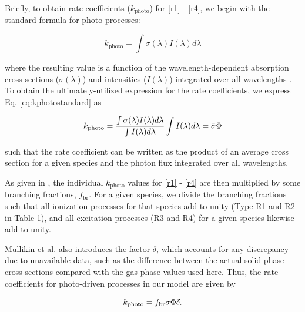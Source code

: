 \documentclass[journal=aesccq,manuscript=article,layout=twocolumn]{achemso}
\begin{document}
Briefly, to obtain rate coefficients ($k_\mathrm{photo}$) for \eqref{r1} - \eqref{r4}, we begin with the standard formula for photo-processes:

\begin{equation}
    k_\mathrm{photo} = \int \sigma(\lambda)I(\lambda) d\lambda
    \label{eq:kphotostandard}
\end{equation}

\noindent  
where the resulting value is a function of the wavelength-dependent absorption cross-sections ($\sigma(\lambda)$) and intensities ($I(\lambda)$) integrated over all wavelengths \citep{van_dishoeck_photodissociation_1988}. To obtain the ultimately-utilized expression for the rate coefficients, we express Eq. \eqref{eq:kphotostandard} as

\begin{equation}
    k_\mathrm{photo} = \frac{\int \sigma(\lambda)I(\lambda)d\lambda}{\int I(\lambda)d\lambda} \int I(\lambda)d\lambda = \Bar{\sigma}\Phi
    \label{eq:kmullikin}
\end{equation}

\noindent
such that the rate coefficient can be written as the product of an average cross section for a given species and the photon flux integrated over all wavelengths. 

As given in \citet{mullikin_new_2021}, the individual $k_\mathrm{photo}$ values for \eqref{r1} - \eqref{r4} are then multiplied by some branching fractions, $f_\mathrm{br}$. For a given species, we divide the branching fractions such that all ionization processes for that species add to unity (Type R1 and R2 in Table 1), and all excitation processes (R3 and R4) for a given species likewise add to unity.

Mullikin et al. also introduces the factor $\delta$, which accounts for any discrepancy due to unavailable data, such as the difference between the actual solid phase cross-sections compared with the gas-phase values used here. Thus, the rate coefficients for photo-driven processes in our model are given by

\begin{equation}
    k_\mathrm{photo} = f_\mathrm{br}\Bar{\sigma}\Phi\delta.
\end{equation}
\end{document}
